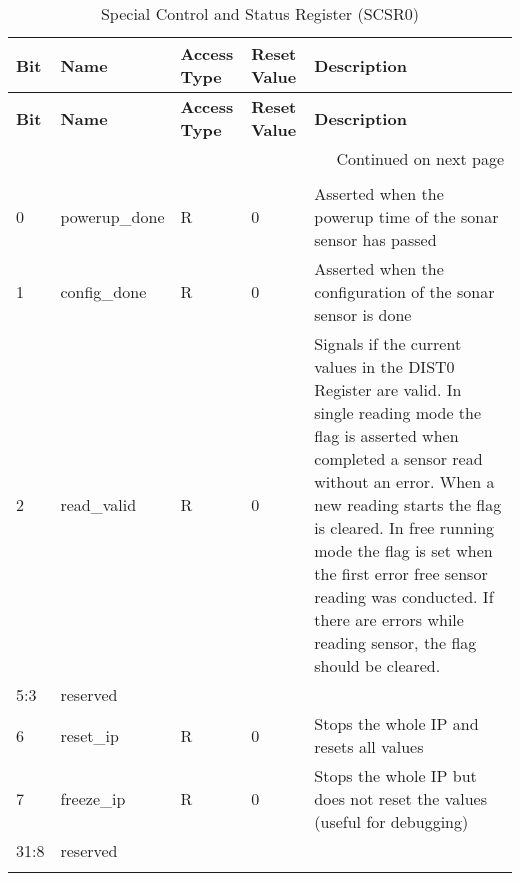     \begin{longtable}{|p{1cm}|p{3cm}|p{2cm}|p{1cm}|p{6.25cm}|}
    \hline
    \textbf{Bit} & \textbf{Name} & \textbf{Access Type} & \textbf{Reset Value} & \textbf{Description} \\
    \hline
    \endfirsthead
    \hline
    \textbf{Bit} & \textbf{Name} & \textbf{Access Type} & \textbf{Reset Value} & \textbf{Description} \\
    \hline
    \endhead
    \hline \multicolumn{5}{|r|}{{Continued on next page}} \\ \hline
    \endfoot
    \hline
    \endlastfoot

    \multicolumn{5}{|c|}{\textbf{0x18 SCSR0 - Special Control and Status Register}} \\
    \hline
    0 & powerup\_done & R & 0 & Asserted when the powerup time of the sonar sensor has passed \\
    \hline
    1 & config\_done & R & 0 & Asserted when the configuration of the sonar sensor is done \\
    \hline
    2 & read\_valid & R & 0 & Signals if the current values in the DIST0 Register are valid.
    \newline In single reading mode the flag is asserted when completed a sensor read without an error. When a new reading starts the flag is cleared.
    \newline In free running mode the flag is set when the first error free sensor reading was conducted. If there are errors while reading sensor, the flag should be cleared.
    \\
    \hline
    5:3 & reserved & & & \\
    \hline
    6 & reset\_ip & R & 0 & Stops the whole IP and resets all values \\
    \hline
    7 & freeze\_ip & R & 0 & Stops the whole IP but does not reset the values (useful for debugging) \\
    \hline
    31:8 & reserved & & & \\
    \hline
    \caption{Special Control and Status Register (SCSR0)}
    \label{tab:scsr0}
    \end{longtable}

